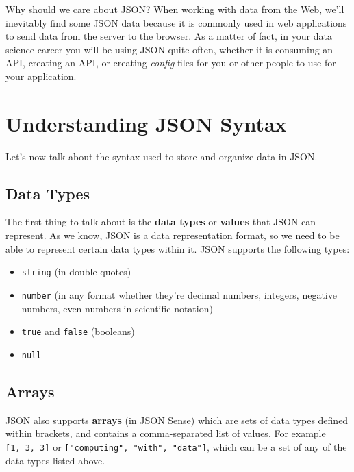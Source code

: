 \documentclass[
]{book}
\begin{document}
Why should we care about JSON? When working with data from the Web, we'll
inevitably find some JSON data because it is commonly used in web applications
to send data from the server to the browser. As a matter of fact, in your data
science career you will be using JSON quite often, whether it is consuming an
API, creating an API, or creating \emph{config} files for you or other people to use
for your application.

\hypertarget{understanding-json-syntax}{%
\section{Understanding JSON Syntax}\label{understanding-json-syntax}}

Let's now talk about the syntax used to store and organize data in JSON.

\hypertarget{data-types}{%
\subsection{Data Types}\label{data-types}}

The first thing to talk about is the \textbf{data types} or \textbf{values} that JSON can
represent. As we know, JSON is a data representation format, so we need to be
able to represent certain data types within it. JSON supports the following types:

\begin{itemize}
\item
  \texttt{string} (in double quotes)
\item
  \texttt{number} (in any format whether they're decimal numbers, integers, negative
  numbers, even numbers in scientific notation)
\item
  \texttt{true} and \texttt{false} (booleans)
\item
  \texttt{null}
\end{itemize}

\hypertarget{arrays}{%
\subsection{Arrays}\label{arrays}}

JSON also supports \textbf{arrays} (in JSON Sense) which are sets of data types
defined within brackets, and contains a comma-separated list of values.
For example \texttt{{[}1,\ 3,\ 3{]}} or \texttt{{[}"computing",\ "with",\ "data"{]}},
which can be a set of any of the data types listed above.
\end{document}
